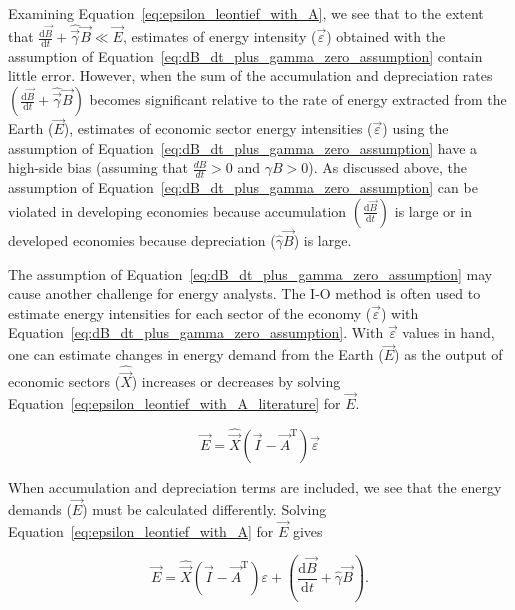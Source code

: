 Examining Equation~\ref{eq:epsilon_leontief_with_A}, 
we see that to the extent that 
$\frac{\mathrm{d}\vec{B}}{\mathrm{d}t} + \hat{\vec{\gamma}}\vec{B} \ll \vec{E}$, 
estimates of energy intensity ($\vec{\varepsilon}$) 
obtained with the assumption of Equation~\ref{eq:dB_dt_plus_gamma_zero_assumption} 
contain little error. 
However, when the sum of the accumulation and depreciation rates 
$\left(\frac{\mathrm{d}\vec{B}}{\mathrm{d}t} + \hat{\vec{\gamma}}\vec{B}\right)$ 
becomes significant relative to the rate of energy extracted 
from the Earth ($\vec{E}$), 
estimates of economic sector energy intensities ($\vec{\varepsilon}$) 
using the assumption of Equation~\ref{eq:dB_dt_plus_gamma_zero_assumption} 
have a high-side bias (assuming that $\frac{dB}{dt} >0$ and $\gamma B > 0$). 
As discussed above, the assumption of Equation~\ref{eq:dB_dt_plus_gamma_zero_assumption} 
can be violated in developing economies 
because accumulation $\left(\frac{\mathrm{d}\vec{B}}{\mathrm{d}t}\right)$ 
is large or in developed economies because depreciation ($\hat{\gamma}\vec{B}$) is large. 

The assumption of Equation~\ref{eq:dB_dt_plus_gamma_zero_assumption} 
may cause another challenge for energy analysts. 
The I-O method is often used to estimate energy intensities 
for each sector of the economy ($\vec{\varepsilon}$) 
with Equation~\ref{eq:dB_dt_plus_gamma_zero_assumption}. 
With $\vec{\varepsilon}$ values in hand, 
one can estimate changes in energy demand from the Earth ($\vec{E}$) 
as the output of economic sectors ($\hat{\vec{X}}$) 
increases or decreases by solving 
Equation~\ref{eq:epsilon_leontief_with_A_literature} for $\vec{E}$.

\begin{equation} \label{eq:Leontief_lit_solved_for_E}
	\vec{E} 
	= \hat{\vec{X}}(\vec{I} 
	- \vec{A}^{\mathrm{T}})\vec{\varepsilon}
\end{equation}

When accumulation and depreciation terms are included, 
we see that the energy demands ($\vec{E}$) must be calculated differently. 
Solving Equation~\ref{eq:epsilon_leontief_with_A} 
for $\vec{E}$ gives 

\begin{equation} \label{eq:Leontief_solved_for_E_with_embodied_depreciation}
	\vec{E} = \hat{\vec{X}}(\vec{I} - \vec{A}^{\mathrm{T}})\varepsilon + \left(\frac{\mathrm{d}\vec{B}}{\mathrm{d}t} + \hat{\gamma}\vec{B}\right).
\end{equation}

